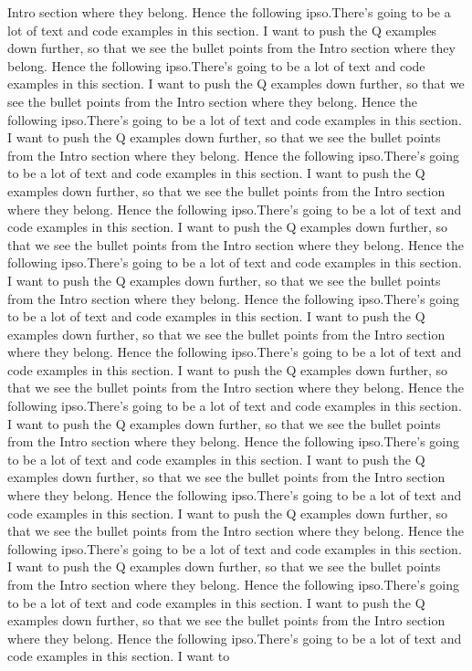 \documentclass[preprint]{sigplanconf}
\begin{document}
Intro section where they belong.  Hence the following ipso.There's going to be a
lot of text and code examples in this section.  I want to
push the Q examples down further, so that we see the bullet points from the
Intro section where they belong.  Hence the following ipso.There's going to be a
lot of text and code examples in this section.  I want to
push the Q examples down further, so that we see the bullet points from the
Intro section where they belong.  Hence the following ipso.There's going to be a
lot of text and code examples in this section.  I want to
push the Q examples down further, so that we see the bullet points from the
Intro section where they belong.  Hence the following ipso.There's going to be a
lot of text and code examples in this section.  I want to
push the Q examples down further, so that we see the bullet points from the
Intro section where they belong.  Hence the following ipso.There's going to be a
lot of text and code examples in this section.  I want to
push the Q examples down further, so that we see the bullet points from the
Intro section where they belong.  Hence the following ipso.There's going to be a
lot of text and code examples in this section.  I want to
push the Q examples down further, so that we see the bullet points from the
Intro section where they belong.  Hence the following ipso.There's going to be a
lot of text and code examples in this section.  I want to
push the Q examples down further, so that we see the bullet points from the
Intro section where they belong.  Hence the following ipso.There's going to be a
lot of text and code examples in this section.  I want to
push the Q examples down further, so that we see the bullet points from the
Intro section where they belong.  Hence the following ipso.There's going to be a
lot of text and code examples in this section.  I want to
push the Q examples down further, so that we see the bullet points from the
Intro section where they belong.  Hence the following ipso.There's going to be a
lot of text and code examples in this section.  I want to
push the Q examples down further, so that we see the bullet points from the
Intro section where they belong.  Hence the following ipso.There's going to be a
lot of text and code examples in this section.  I want to
push the Q examples down further, so that we see the bullet points from the
Intro section where they belong.  Hence the following ipso.There's going to be a
lot of text and code examples in this section.  I want to
push the Q examples down further, so that we see the bullet points from the
Intro section where they belong.  Hence the following ipso.There's going to be a
lot of text and code examples in this section.  I want to
push the Q examples down further, so that we see the bullet points from the
Intro section where they belong.  Hence the following ipso.There's going to be a
lot of text and code examples in this section.  I want to
\end{document}
